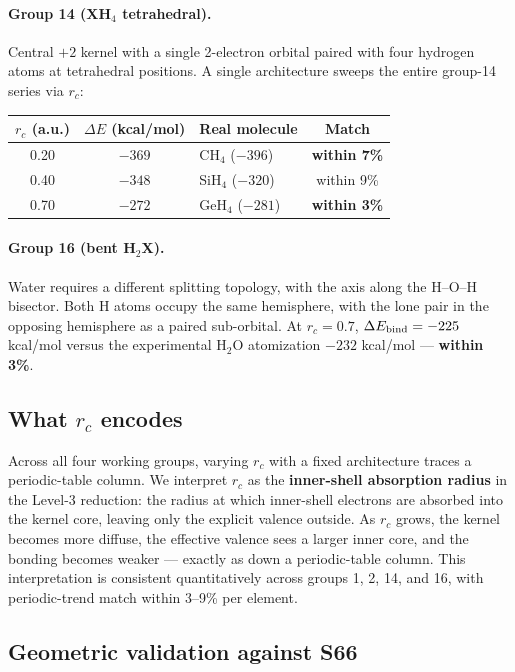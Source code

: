 \documentclass[11pt]{article}
\begin{document}
\paragraph{Group 14 (XH$_4$ tetrahedral).}
Central $+2$ kernel with a single 2-electron orbital paired with four hydrogen atoms at tetrahedral positions. A single architecture sweeps the entire group-14 series via $r_c$:

\begin{center}
\begin{tabular}{c c l c}
\toprule
$r_c$ (a.u.) & $\Delta E$ (kcal/mol) & Real molecule & Match \\
\midrule
0.20 & $-369$ & CH$_4$ ($-396$) & \textbf{within 7\%} \\
0.40 & $-348$ & SiH$_4$ ($-320$) & within 9\% \\
0.70 & $-272$ & GeH$_4$ ($-281$) & \textbf{within 3\%} \\
\bottomrule
\end{tabular}
\end{center}

\paragraph{Group 16 (bent H$_2$X).}
Water requires a different splitting topology, with the axis along the H--O--H bisector. Both H atoms occupy the same hemisphere, with the lone pair in the opposing hemisphere as a paired sub-orbital. At $r_c = 0.7$, $\Delta E_{\rm bind} = -225$ kcal/mol versus the experimental H$_2$O atomization $-232$ kcal/mol --- \textbf{within 3\%}.

\subsection{What $r_c$ encodes}

Across all four working groups, varying $r_c$ with a fixed architecture traces a periodic-table column. We interpret $r_c$ as the \textbf{inner-shell absorption radius} in the Level-3 reduction: the radius at which inner-shell electrons are absorbed into the kernel core, leaving only the explicit valence outside. As $r_c$ grows, the kernel becomes more diffuse, the effective valence sees a larger inner core, and the bonding becomes weaker --- exactly as down a periodic-table column. This interpretation is consistent quantitatively across groups 1, 2, 14, and 16, with periodic-trend match within 3--9\% per element.

\subsection{Geometric validation against S66}
\end{document}
